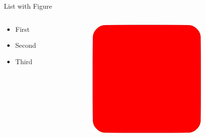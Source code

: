 \begin{frame}{List with Figure}
\begin{columns}
    \begin{column}{0.48\textwidth}
        \begin{itemize}
            \item First
            \item Second
            \item Third 
        \end{itemize}
    \end{column}
    \begin{column}{0.48\textwidth}
        \centering
        \includegraphics[width=\linewidth]{assets/placeholder.png}
    \end{column}
\end{columns}
\end{frame}
